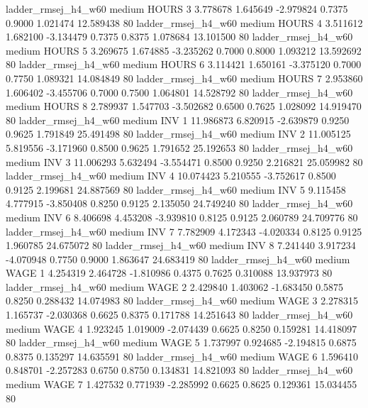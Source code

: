    ladder_rmsej_h4_w60     medium    HOURS                 3  3.778678 1.645649 -2.979824 0.7375 0.9000  1.021474   12.589438 80
   ladder_rmsej_h4_w60     medium    HOURS                 4  3.511612 1.682100 -3.134479 0.7375 0.8375  1.078684   13.101500 80
   ladder_rmsej_h4_w60     medium    HOURS                 5  3.269675 1.674885 -3.235262 0.7000 0.8000  1.093212   13.592692 80
   ladder_rmsej_h4_w60     medium    HOURS                 6  3.114421 1.650161 -3.375120 0.7000 0.7750  1.089321   14.084849 80
   ladder_rmsej_h4_w60     medium    HOURS                 7  2.953860 1.606402 -3.455706 0.7000 0.7500  1.064801   14.528792 80
   ladder_rmsej_h4_w60     medium    HOURS                 8  2.789937 1.547703 -3.502682 0.6500 0.7625  1.028092   14.919470 80
   ladder_rmsej_h4_w60     medium      INV                 1 11.986873 6.820915 -2.639879 0.9250 0.9625  1.791849   25.491498 80
   ladder_rmsej_h4_w60     medium      INV                 2 11.005125 5.819556 -3.171960 0.8500 0.9625  1.791652   25.192653 80
   ladder_rmsej_h4_w60     medium      INV                 3 11.006293 5.632494 -3.554471 0.8500 0.9250  2.216821   25.059982 80
   ladder_rmsej_h4_w60     medium      INV                 4 10.074423 5.210555 -3.752617 0.8500 0.9125  2.199681   24.887569 80
   ladder_rmsej_h4_w60     medium      INV                 5  9.115458 4.777915 -3.850408 0.8250 0.9125  2.135050   24.749240 80
   ladder_rmsej_h4_w60     medium      INV                 6  8.406698 4.453208 -3.939810 0.8125 0.9125  2.060789   24.709776 80
   ladder_rmsej_h4_w60     medium      INV                 7  7.782909 4.172343 -4.020334 0.8125 0.9125  1.960785   24.675072 80
   ladder_rmsej_h4_w60     medium      INV                 8  7.241440 3.917234 -4.070948 0.7750 0.9000  1.863647   24.683419 80
   ladder_rmsej_h4_w60     medium     WAGE                 1  4.254319 2.464728 -1.810986 0.4375 0.7625  0.310088   13.937973 80
   ladder_rmsej_h4_w60     medium     WAGE                 2  2.429840 1.403062 -1.683450 0.5875 0.8250  0.288432   14.074983 80
   ladder_rmsej_h4_w60     medium     WAGE                 3  2.278315 1.165737 -2.030368 0.6625 0.8375  0.171788   14.251643 80
   ladder_rmsej_h4_w60     medium     WAGE                 4  1.923245 1.019009 -2.074439 0.6625 0.8250  0.159281   14.418097 80
   ladder_rmsej_h4_w60     medium     WAGE                 5  1.737997 0.924685 -2.194815 0.6875 0.8375  0.135297   14.635591 80
   ladder_rmsej_h4_w60     medium     WAGE                 6  1.596410 0.848701 -2.257283 0.6750 0.8750  0.134831   14.821093 80
   ladder_rmsej_h4_w60     medium     WAGE                 7  1.427532 0.771939 -2.285992 0.6625 0.8625  0.129361   15.034455 80
